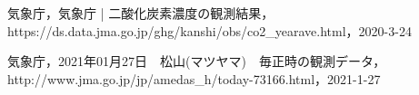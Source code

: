 \begin{thebibliography}{99}
気象庁，気象庁 | 二酸化炭素濃度の観測結果，https://ds.data.jma.go.jp/ghg/kanshi/obs/co2\_yearave.html，2020-3-24

気象庁，2021年01月27日　松山(マツヤマ)　毎正時の観測データ，http://www.jma.go.jp/jp/amedas\_h/today-73166.html，2021-1-27




\end{thebibliography}

